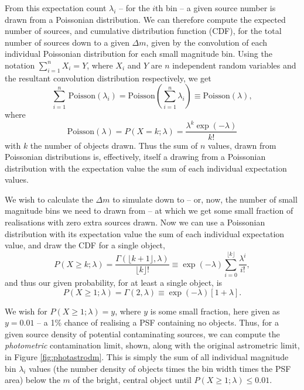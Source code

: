 \documentclass[fleqn,usenatbib]{mnras}
\begin{document}
From this expectation count $\lambda_i$ -- for the $i$th bin -- a given source number is drawn from a Poissonian distribution.
We can therefore compute the expected number of sources, and cumulative distribution function (CDF), for the total number of sources down to a given $\Delta m$, given by the convolution of each individual Poissonian distribution for each small magnitude bin.
Using the notation $\sum_{i=1}^n X_i = Y$, where $X_i$ and $Y$ are $n$ independent random variables and the resultant convolution distribution respectively, we get
\begin{equation}
    \sum\limits_{i=1}^n\,\mathrm{Poisson}(\lambda_i) = \mathrm{Poisson}\left(\sum\limits_{i=1}^n\lambda_i\right) \equiv \mathrm{Poisson}(\lambda),
\end{equation}
where
\begin{equation}
\mathrm{Poisson}(\lambda) = P(X = k; \lambda) = \frac{\lambda^k \exp(-\lambda)}{k!}
\end{equation}
with $k$ the number of objects drawn.
Thus the sum of $n$ values, drawn from Poissonian distributions is, effectively, itself a drawing from a Poissonian distribution with the expectation value the sum of each individual expectation values.

We wish to calculate the $\Delta m$ to simulate down to -- or, now, the number of small magnitude bins we need to drawn from -- at which we get some small fraction of realisations with zero extra sources drawn.
Now we can use a Poissonian distribution with its expectation value the sum of each individual expectation value, and draw the CDF for a single object,
\begin{equation}
    P(X \geq k; \lambda) = \frac{\Gamma(\lfloor k + 1 \rfloor, \lambda)}{\lfloor k \rfloor!} \equiv \exp(-\lambda) \sum_{i=0}^{\lfloor k \rfloor}\frac{\lambda^i}{i!},
\end{equation}
and thus our given probability, for at least a single object, is
\begin{equation}
    P(X \geq 1; \lambda) = \Gamma(2, \lambda) \equiv \exp(-\lambda) \left[1 + \lambda\right].
\end{equation}

We wish for $P(X \geq 1; \lambda) = y$, where $y$ is some small fraction, here given as $y = 0.01$ -- a 1\% chance of realising a PSF containing no objects.
Thus, for a given source density of potential contaminating sources, we can compute the \textit{photometric} contamination limit, shown, along with the original astrometric limit, in Figure \ref{fig:photastrodm}.
This is simply the sum of all individual magnitude bin $\lambda_i$ values (the number density of objects times the bin width times the PSF area) below the $m$ of the bright, central object until $P(X \geq 1; \lambda) \leq 0.01$.
\end{document}
